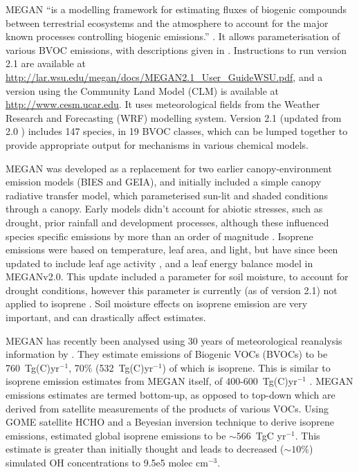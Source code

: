     MEGAN ``is a modelling framework for estimating fluxes of biogenic compounds between terrestrial ecosystems and the atmosphere to account for the major known processes controlling biogenic emissions.'' \citep{Guenther2012}.
    It allows parameterisation of various BVOC emissions, with descriptions given in \cite{Guenther2012}.
    Instructions to run version 2.1 are available at \url{http://lar.wsu.edu/megan/docs/MEGAN2.1_User_GuideWSU.pdf}, and a version using the Community Land Model (CLM) is available at \url{http://www.cesm.ucar.edu}.
    It uses meteorological fields from the Weather Research and Forecasting (WRF) modelling system.
    Version 2.1 (updated from 2.0 \citep{Guenther2006}) includes 147 species, in 19 BVOC classes, which can be lumped together to provide appropriate output for mechanisms in various chemical models.
    
    MEGAN was developed as a replacement for two earlier canopy-environment emission models (BIES and GEIA), and initially included a simple canopy radiative transfer model, which parameterised sun-lit and shaded conditions through a canopy.
    Early models didn't account for abiotic stresses, such as drought, prior rainfall and development processes, although these influenced species specific emissions by more than an order of magnitude \citep{Niinemets1999}.
    Isoprene emissions were based on temperature, leaf area, and light, but have since been updated to include leaf age activity \citep{Guenther2000}, and a leaf energy balance model \citep{Guenther2006} in MEGANv2.0.
    This update included a parameter for soil moisture, to account for drought conditions, however this parameter is currently (as of version 2.1) not applied to isoprene \citep{Sindelarova2014}.
    Soil moisture effects on isoprene emission are very important, and can drastically affect estimates.
    
    MEGAN has recently been analysed using 30 years of meteorological reanalysis information by \cite{Sindelarova2014}.
    They estimate emissions of Biogenic VOCs (BVOCs) to be 760~Tg(C)yr$^{-1}$, 70\% (532~Tg(C)yr$^{-1}$) of which is isoprene.
    This is similar to isoprene emission estimates from MEGAN itself, of 400-600~Tg(C)yr$^{-1}$ \citep{Guenther2006}.
    MEGAN emissions estimates are termed bottom-up, as opposed to top-down which are derived from satellite measurements of the products of various VOCs.
    Using GOME satellite HCHO and a Beyesian inversion technique to derive isoprene emissions, \cite{Shim2005} estimated global isoprene emissions to be $\sim566$~TgC yr$^{-1}$. 
    This estimate is greater than initially thought and leads to decreased ($\sim10\%$) simulated OH concentrations to 9.5e5 molec cm$^{-3}$.
    
